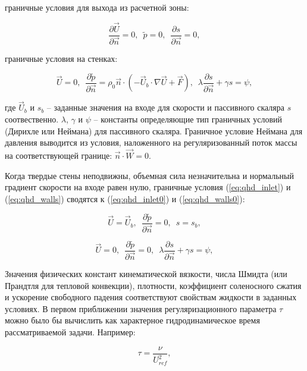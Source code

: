 граничные условия для выхода из расчетной зоны:

\begin{equation}\label{eq:qhd_outlet}
        \frac{\partial \vec{U}}{\partial \vec{n}} = 0, \,\,\, \tilde p = 0, \,\,\, \frac{\partial s}{ \partial \vec{n}} = 0,
\end{equation}

граничные условия на стенках:

\begin{equation}\label{eq:qhd_walls}
        \vec{U} = 0, \,\,\, \frac{\partial \tilde p}{ \partial \vec{n}} = \rho_0 \vec n \cdot \left ( -\vec U_b \cdot \nabla \vec U + \vec F \right), \,\,\, \lambda \frac{\partial s}{ \partial \vec{n}} + \gamma s = \psi,
\end{equation}

\noindent где $\vec U_b$ и $s_b$ -- заданные значения на входе для скорости и пассивного скаляра $s$ соотвественно. $\lambda$, $\gamma$ и $\psi$ -- константы определяющие тип граничных условий (Дирихле или Неймана) для пассивного скаляра. Граничное условие Неймана для давления выводится из условия, наложенного на регуляризованный поток массы на соответствующей границе: $\vec n \cdot \vec W = 0$.

Когда твердые стены неподвижны, объемная сила незначительна и нормальный градиент скорости на входе равен нулю, граничные условия (\ref{eq:qhd_inlet}) и (\ref{eq:qhd_walls}) сводятся к (\ref{eq:qhd_inlet0}) и (\ref{eq:qhd_walls0}):

\begin{equation}\label{eq:qhd_inlet0}
      \vec{U} = \vec{U}_b, \,\,\, \frac{\partial \tilde p}{ \partial \vec{n}} = 0, \,\,\, s = s_b,
\end{equation}
  
\begin{equation}\label{eq:qhd_walls0}
      \vec{U} = 0, \,\,\, \frac{\partial \tilde p}{ \partial \vec{n}} = 0, \,\,\, \lambda \frac{\partial s}{ \partial \vec{n}} + \gamma s = \psi,
\end{equation}

Значения физических констант кинематической вязкости, числа Шмидта (или Прандтля для тепловой конвекции), плотности, коэффициент соленосного сжатия и ускорение свободного падения соответствуют свойствам жидкости в заданных условиях. В первом приближении значения регуляризационного параметра $\tau$ можно было бы вычислить как характерное гидродинамическое время рассматриваемой задачи. Например:

\begin{equation}\label{eq:qhd_tau_hydro_scale}
      \tau = \frac{\nu}{U_{ref}^2},
\end{equation}

